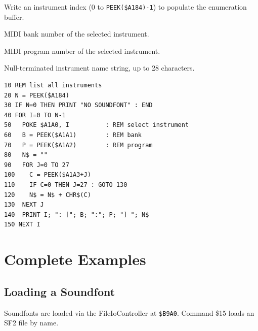 

Write an instrument index (0 to \texttt{PEEK(\$A184)-1}) to populate the
enumeration buffer.



MIDI bank number of the selected instrument.



MIDI program number of the selected instrument.



Null-terminated instrument name string, up to 28 characters.

\begin{lstlisting}
10 REM list all instruments
20 N = PEEK($A184)
30 IF N=0 THEN PRINT "NO SOUNDFONT" : END
40 FOR I=0 TO N-1
50   POKE $A1A0, I          : REM select instrument
60   B = PEEK($A1A1)        : REM bank
70   P = PEEK($A1A2)        : REM program
80   N$ = ""
90   FOR J=0 TO 27
100    C = PEEK($A1A3+J)
110    IF C=0 THEN J=27 : GOTO 130
120    N$ = N$ + CHR$(C)
130  NEXT J
140  PRINT I; ": ["; B; ":"; P; "] "; N$
150 NEXT I
\end{lstlisting}


\section{Complete Examples}
\label{sec:wts-examples}

\subsection{Loading a Soundfont}

Soundfonts are loaded via the FileIoController at \texttt{\$B9A0}.
Command \$15 loads an SF2 file by name.

